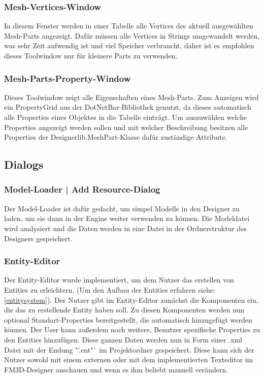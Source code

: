 \subsubsection{Mesh-Vertices-Window}
In diesem Fenster werden in einer Tabelle alle Vertices des aktuell ausgewählten Mesh-Parts angezeigt. Dafür müssen alle Vertices in Strings umgewandelt werden, was sehr Zeit aufwendig ist und viel Speicher verbraucht, daher ist es empfohlen dieses Toolwindow nur für kleinere Parts zu verwenden. 

\subsubsection{Mesh-Parts-Property-Window}
Dieses Toolwindow zeigt alle Eigenschaften eines Mesh-Parts. Zum Anzeigen wird ein PropertyGrid aus der DotNetBar-Bibliothek genutzt, da dieses automatisch alle Properties eines Objektes in die Tabelle einträgt. Um auszuwählen welche Properties angezeigt werden sollen und mit welcher Beschreibung besitzen alle Properties der Designerlib.MeshPart-Klasse dafür zuständige Attribute.

\subsection{Dialogs}
\subsubsection{Model-Loader | Add Resource-Dialog}
Der Model-Loader ist dafür gedacht, um simpel Modelle in den Designer zu laden, um sie dann in der Engine weiter verwenden zu können. Die Modeldatei wird analysiert und die Daten werden in eine Datei in der Ordnerstruktur des Designers gespeichert.

\subsubsection{Entity-Editor}
\label{entityeditor}
Der Entity-Editor wurde implementiert, um dem Nutzer das erstellen von Entities zu erleichtern. (Um den Aufbau der Entities erfahren siehe: \ref{entitysystem}). Der Nutzer gibt im Entity-Editor zunächst die Komponenten ein, die das zu erstellende Entity haben soll. Zu diesen Komponenten werden nun optional Standart-Properties bereitgestellt, die automatisch hinzugefügt werden können. Der User kann außerdem noch weitere, Benutzer spezifische Properties zu den Entities hinzufügen. Diese ganzen Daten werden nun in Form einer .xml Datei mit der Endung "'.ent"` im Projektordner gespeichert. Diese kann sich der Nutzer sowohl mit einem externen oder mit dem implementierten Texteditor im FM3D-Designer anschauen und wenn es ihm beliebt manuell verändern.


